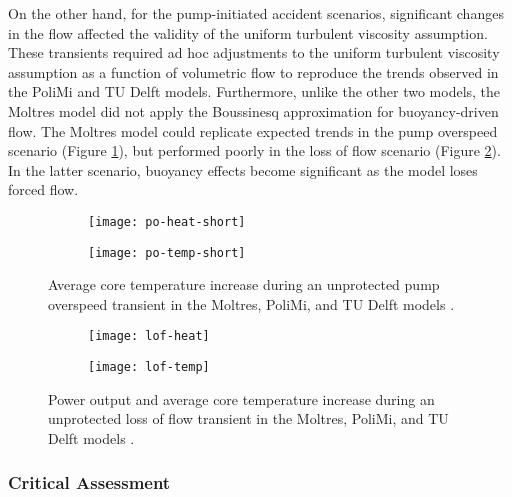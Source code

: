 On the other hand, for the pump-initiated accident scenarios, significant
changes in the flow affected the validity of the uniform turbulent viscosity
assumption. These transients required ad hoc adjustments to the uniform
turbulent viscosity assumption as a function of volumetric flow to reproduce
the trends observed in the PoliMi and TU Delft models. Furthermore, unlike the
other two models, the Moltres model did not apply the Boussinesq approximation
for buoyancy-driven flow. The Moltres model could replicate expected trends in
the pump overspeed scenario (Figure \ref{fig:poshort}), but performed
poorly in the loss of flow scenario (Figure \ref{fig:lof}). In the latter
scenario, buoyancy effects become significant as the model loses forced flow.

\begin{figure}[htb!]
    \centering
    \begin{subfigure}[t]{.485\textwidth}
        \centering
        \texttt{[image: po-heat-short]}
    \end{subfigure}
    \hfill
    \begin{subfigure}[t]{.485\textwidth}
        \centering
        \texttt{[image: po-temp-short]}
    \end{subfigure}
    \caption{Average core temperature increase during
    an unprotected pump overspeed transient in the Moltres, PoliMi, and
    TU Delft models \cite{fiorina_modelling_2014}.}
    \label{fig:poshort}
\end{figure}

\begin{figure}[htb!]
    \centering
    \begin{subfigure}[t]{.485\textwidth}
        \centering
        \texttt{[image: lof-heat]}
    \end{subfigure}
    \hfill
    \begin{subfigure}[t]{.485\textwidth}
        \centering
        \texttt{[image: lof-temp]}
    \end{subfigure}
    \caption{Power output and average core temperature increase during
    an unprotected loss of flow transient in the Moltres, PoliMi, and
    TU Delft models \cite{fiorina_modelling_2014}.}
    \label{fig:lof}
\end{figure}

\subsubsection{Critical Assessment} \label{sec:msfr-critique}


